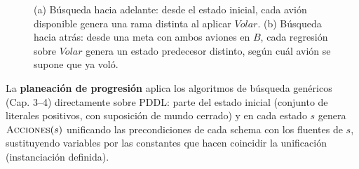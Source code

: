 \begin{figure}[H]
\centering
{}
\caption{(a) Búsqueda hacia adelante: desde el estado inicial, cada avión disponible genera una rama
distinta al aplicar $Volar$. (b) Búsqueda hacia atrás: desde una meta con ambos aviones en $B$, cada
regresión sobre $Volar$ genera un estado predecesor distinto, según cuál avión se supone que ya voló.}
\end{figure}

La \textbf{planeación de progresión} aplica los algoritmos de búsqueda genéricos (Cap. 3--4)
directamente sobre PDDL: parte del estado inicial (conjunto de literales positivos, con suposición de
mundo cerrado) y en cada estado $s$ genera $\textsc{Acciones}(s)$ unificando las precondiciones de
cada schema con los fluentes de $s$, sustituyendo variables por las constantes que hacen coincidir la
unificación (instanciación definida).

